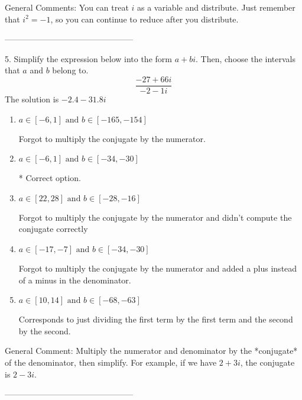 \documentclass{article}[10pt]
\begin{document}
General Comments: You can treat $i$ as a variable and distribute. Just remember that $i^2=-1$, so you can continue to reduce after you distribute.

-----------------------------------------------

5. Simplify the expression below into the form $a+bi$. Then, choose the intervals that $a$ and $b$ belong to.
$$ \frac{-27+66i}{-2-1i} $$ 
The solution is $ -2.4 - 31.8 i $ 

\begin{enumerate}[label=\Alph*.] 
\item $ a \in [-6, 1] \text{ and } b \in [-165, -154] $ 

  Forgot to multiply the conjugate by the numerator. 
\item $ a \in [-6, 1] \text{ and } b \in [-34, -30] $ 

 * Correct option. 
\item $ a \in [22, 28] \text{ and } b \in [-28, -16] $ 

  Forgot to multiply the conjugate by the numerator and didn't compute the conjugate correctly 
\item $ a \in [-17, -7] \text{ and } b \in [-34, -30] $ 

  Forgot to multiply the conjugate by the numerator and added a plus instead of a minus in the denominator. 
\item $ a \in [10, 14] \text{ and } b \in [-68, -63] $ 

  Corresponds to just dividing the first term by the first term and the second by the second. 
\end{enumerate} 
 
General Comment: Multiply the numerator and denominator by the *conjugate* of the denominator, then simplify. For example, if we have $2+3i$, the conjugate is $2-3i$.

-----------------------------------------------
\end{document}
